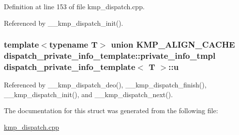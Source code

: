 Definition at line 153 of file kmp\-\_\-dispatch.\-cpp.



Referenced by \-\_\-\-\_\-kmp\-\_\-dispatch\-\_\-init().

\hypertarget{structdispatch__private__info__template_af9721ce0273cf9cfe4674af244007e7b}{
\subsubsection[{u}]{\setlength{\rightskip}{0pt plus 5cm}template$<$typename T$>$ union {\bf K\-M\-P\-\_\-\-A\-L\-I\-G\-N\-\_\-\-C\-A\-C\-H\-E} {\bf dispatch\-\_\-private\-\_\-info\-\_\-template\-::private\-\_\-info\-\_\-tmpl}  {\bf dispatch\-\_\-private\-\_\-info\-\_\-template}$<$ T $>$\-::u}}\label{structdispatch__private__info__template_af9721ce0273cf9cfe4674af244007e7b}


Referenced by \-\_\-\-\_\-kmp\-\_\-dispatch\-\_\-deo(), \-\_\-\-\_\-kmp\-\_\-dispatch\-\_\-finish(), \-\_\-\-\_\-kmp\-\_\-dispatch\-\_\-init(), and \-\_\-\-\_\-kmp\-\_\-dispatch\-\_\-next().



The documentation for this struct was generated from the following file\-:\begin{DoxyCompactItemize}
\item 
\hyperlink{kmp__dispatch_8cpp}{kmp\-\_\-dispatch.\-cpp}\end{DoxyCompactItemize}
